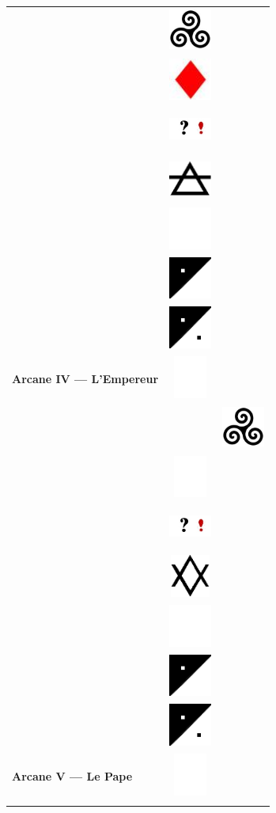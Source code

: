 \documentclass[11pt,oneside,a4paper]{article} %
\newcommand{\colornone}{ \includegraphics[width=1.40cm, height=1.40cm]{../../tarotData/img/color_none.jpg} }
\newcommand{\colorcarr}{ \includegraphics[width=1.40cm, height=1.40cm]{../../tarotData/img/color_carreau.jpg} }
\newcommand{\colorinte}{ \includegraphics[width=1.40cm, height=1.40cm]{../../tarotData/img/color_interrexclam.jpg} }
\newcommand{\elementneu}{ \includegraphics[width=1.40cm, height=1.40cm]{../../tarotData/img/element_neutral.jpg} }
\newcommand{\elementair}{ \includegraphics[width=1.40cm, height=1.40cm]{../../tarotData/img/element_air.jpg} }
\newcommand{\tricurve}{ \includegraphics[width=1.40cm, height=1.40cm]{../img/tricurve.jpg} }
\newcommand{\partEmpt}{ \includegraphics[width=1.40cm, height=1.40cm]{../img/CountEmptyPart.png} }
\newcommand{\partHalf}{ \includegraphics[width=1.40cm, height=1.40cm]{../img/CountHalfPart.png} }
\newcommand{\partPlai}{ \includegraphics[width=1.40cm, height=1.40cm]{../img/CountPlainPart.png} }
\begin{document}
\begin{longtable}[ht]{ l l l }
{\begin{tabular}[ht]{ @{}m{4.50cm}@{} @{}p{1.50cm}@{} }
											&	\tricurve		\\
											&	\colorcarr		\\
											&	\colorinte		\\
											&	\elementair		\\
											&	\partEmpt		\\
											&	\partHalf		\\
											&	\partPlai		\\
			\hline
			\textbf{\footnotesize Arcane IV --- L'Empereur}	&	\colornone		\\
		\end{tabular}
	}	&
	\Ovalbox{%
		\begin{tabular}[ht]{ @{}m{4.50cm}@{} @{}p{1.50cm}@{} }
			\multirow{ 7 }{4.45cm}{ \includegraphics[width=4.45cm, height=9.00cm]{../../tarotData/img/5_LePape.jpg} \vfill } 
											&	\tricurve		\\
											&	\colornone		\\
											&	\colorinte		\\
											&	\elementneu		\\
											&	\partEmpt		\\
											&	\partHalf		\\
											&	\partPlai		\\
			\hline
			\textbf{\footnotesize Arcane V --- Le Pape}	&	\colornone		\\
		\end{tabular}
	}	\\
	
	

\end{longtable}
\end{document}
